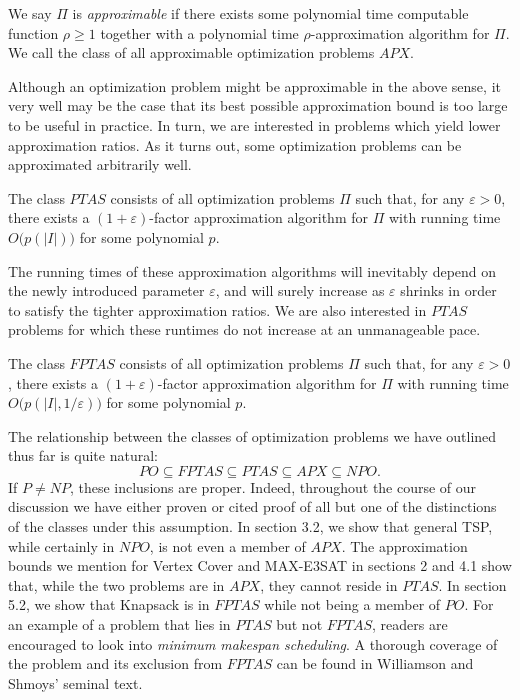 \documentclass{article}
\newenvironment{definition}[2][Definition]{\begin{trivlist}
\item[\hskip \labelsep {\bfseries #1}\hskip \labelsep {\hspace{-1ex}\bfseries #2.}]}{\end{trivlist}}
\begin{document}
\begin{definition}{ ($APX$-Optimization Problems)}{}
    We say $\Pi$ is \textit{approximable} if there exists some polynomial time computable function $\rho \geq 1$ together with a polynomial time $\rho$-approximation algorithm for $\Pi$. We call the class of all approximable optimization problems $APX$.
\end{definition}

\noindent Although an optimization problem might be approximable in the above sense, it very well may be the case that its best possible approximation bound is too large to be useful in practice. In turn, we are interested in problems which yield lower approximation ratios. As it turns out, some optimization problems can be approximated arbitrarily well.

\begin{definition}{ ($PTAS$-Optimization Problems)}{}
    The class $PTAS$ consists of all optimization problems $\Pi$ such that, for any $\varepsilon > 0$, there exists a $(1+\varepsilon)$-factor approximation algorithm for $\Pi$ with running time $O\bigl(p(|I|)\bigr)$ for some polynomial $p$.
\end{definition}

\noindent The running times of these approximation algorithms will inevitably depend on the newly introduced parameter $\varepsilon$, and will surely increase as $\varepsilon$ shrinks in order to satisfy the tighter approximation ratios. We are also interested in $PTAS$ problems for which these runtimes do not increase at an unmanageable pace.

\begin{definition}{ ($FPTAS$-Optimization Problems)}{}
    The class $FPTAS$ consists of all optimization problems $\Pi$ such that, for any $\varepsilon > 0$, there exists a $(1+\varepsilon)$-factor approximation algorithm for $\Pi$ with running time $O\bigl(p(|I|, 1/\varepsilon)\bigr)$ for some polynomial $p$.
\end{definition}

\noindent The relationship between the classes of optimization problems we have outlined thus far is quite natural:
\[
PO \subseteq FPTAS \subseteq PTAS \subseteq APX \subseteq NPO.
\]
\noindent If $P \neq NP$, these inclusions are proper. Indeed, throughout the course of our discussion we have either proven or cited proof of all but one of the distinctions of the classes under this assumption. In section 3.2, we show that general TSP, while certainly in $NPO$, is not even a member of $APX$. The approximation bounds we mention for Vertex Cover and MAX-E3SAT in sections 2 and 4.1 show that, while the two problems are in $APX$, they cannot reside in $PTAS$. In section 5.2, we show that Knapsack is in $FPTAS$ while not being a member of $PO$. For an example of a problem that lies in $PTAS$ but not $FPTAS$, readers are encouraged to look into \textit{minimum makespan scheduling}. A thorough coverage of the problem and its exclusion from $FPTAS$ can be found in Williamson and Shmoys' seminal text.
\end{document}
